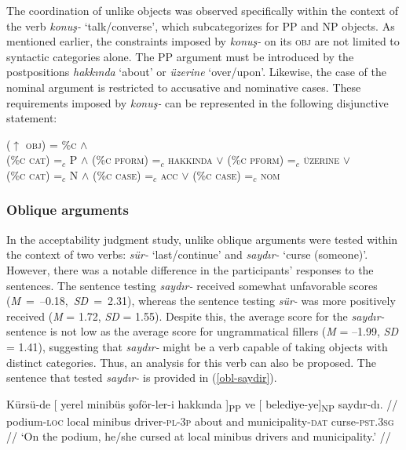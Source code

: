 The coordination of unlike objects was observed specifically within the context of the verb \textit{konuş-} `talk/converse', which subcategorizes for PP and NP objects. As mentioned earlier, the constraints imposed by \textit{konuş-} on its \textsc{obj} are not limited to syntactic categories alone. The PP argument must be introduced by the postpositions \textit{hakkında} `about' or \textit{üzerine} `over/upon'. Likewise, the case of the nominal argument is restricted to accusative and nominative cases. These requirements imposed by \textit{konuş-} can be represented in the following disjunctive statement:

\ex
\label{konus:statement}
($\uparrow$ \textsc{obj}) = \%\textsc{c} $\land$ \\
\vspace{3pt}\text{[[}(\%\textsc{c cat}) =$_c$ P $\land$ \text{[}(\%\textsc{c pform}) =$_c$ \textsc{hakkinda} $\lor$ (\%\textsc{c pform}) =$_c$ \textsc{üzerine}\text{]]} $\lor$ \\
\text{[}(\%\textsc{c cat}) =$_c$ N $\land$ \text{[}(\%\textsc{c case}) =$_c$ \textsc{acc} $\lor$ (\%\textsc{c case}) =$_c$ \textsc{nom}\text{]]]}
\xe


\subsubsection{Oblique arguments}

\begin{sloppypar}
In the acceptability judgment study, unlike oblique arguments were tested within the context of two verbs: \textit{sür-} `last/continue' and \textit{saydır-} `curse (someone)'. However, there was a notable difference in the participants' responses to the sentences. The sentence testing \textit{saydır-} received somewhat unfavorable scores \mbox{(\textit{M} = --0.18, \textit{SD} = 2.31)}, whereas the sentence testing \textit{sür-} was more positively received (\textit{M} = 1.72, \textit{SD} = 1.55). Despite this, the average score for the \textit{saydır-} sentence is not low as the average score for ungrammatical fillers (\textit{M} = --1.99, \textit{SD} = 1.41), suggesting that \textit{saydır-} might be a verb capable of taking objects with distinct categories. Thus, an analysis for this verb can also be proposed. The sentence that tested \textit{saydır-} is provided in (\ref{obl-saydir}).
\end{sloppypar}

\pex[glspace=!1em,everygla={},everyglb={},aboveglbskip=-.15ex, interpartskip=15pt]
\label{obl-saydir} 
\begingl
\gla Kürsü-de {[} yerel minibüs şoför-ler-i {hakkında ]\textsubscript{PP}} ve {[} {belediye-ye]\textsubscript{NP}} saydır-dı. //
\glb podium-\textsc{loc} local minibus driver-\textsc{pl}-\textsc{3p} about and municipality-\textsc{dat} curse-\textsc{pst.3sg} //
\glft `On the podium, he/she cursed at local minibus drivers and municipality.' //
\endgl
\xe

